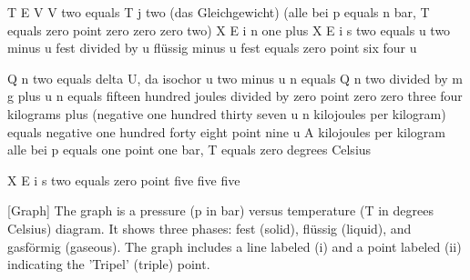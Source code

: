 T E V V two equals T j two (das Gleichgewicht)  
(alle bei p equals n bar, T equals zero point zero zero zero two)  
X E i n one plus X E i s two equals u two minus u fest divided by u flüssig minus u fest equals zero point six four u  

Q n two equals delta U, da isochor  
u two minus u n equals Q n two divided by m g plus u n equals fifteen hundred joules divided by zero point zero zero three four kilograms plus (negative one hundred thirty seven u n kilojoules per kilogram) equals negative one hundred forty eight point nine u A kilojoules per kilogram  
alle bei p equals one point one bar, T equals zero degrees Celsius  

X E i s two equals zero point five five five

[Graph] The graph is a pressure (p in bar) versus temperature (T in degrees Celsius) diagram. It shows three phases: fest (solid), flüssig (liquid), and gasförmig (gaseous). The graph includes a line labeled (i) and a point labeled (ii) indicating the 'Tripel' (triple) point.